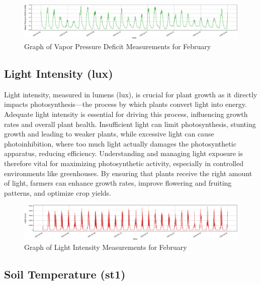 \begin{figure}[htbp]
    \centering
    \includegraphics[width=15 cm]{4_ChapterMaterials/figuras/train_data_Vapor_Pressure_Deficit.pdf}
    \caption{Graph of Vapor Pressure Deficit Measurements for February}
    \end{figure}

\subsection{Light Intensity (lux)}

Light intensity, measured in lumens (lux), is crucial for plant growth as it directly impacts photosynthesis—the process by which plants convert light into energy. Adequate light intensity is essential for driving this process, influencing growth rates and overall plant health. Insufficient light can limit photosynthesis, stunting growth and leading to weaker plants, while excessive light can cause photoinhibition, where too much light actually damages the photosynthetic apparatus, reducing efficiency. Understanding and managing light exposure is therefore vital for maximizing photosynthetic activity, especially in controlled environments like greenhouses. By ensuring that plants receive the right amount of light, farmers can enhance growth rates, improve flowering and fruiting patterns, and optimize crop yields.

\begin{figure}[htbp]
    \centering
    \includegraphics[width=15 cm]{4_ChapterMaterials/figuras/train_data_Light.pdf}
    \caption{Graph of Light Intensity Measurements for February}
    \end{figure}

\subsection{Soil Temperature (st1)}

